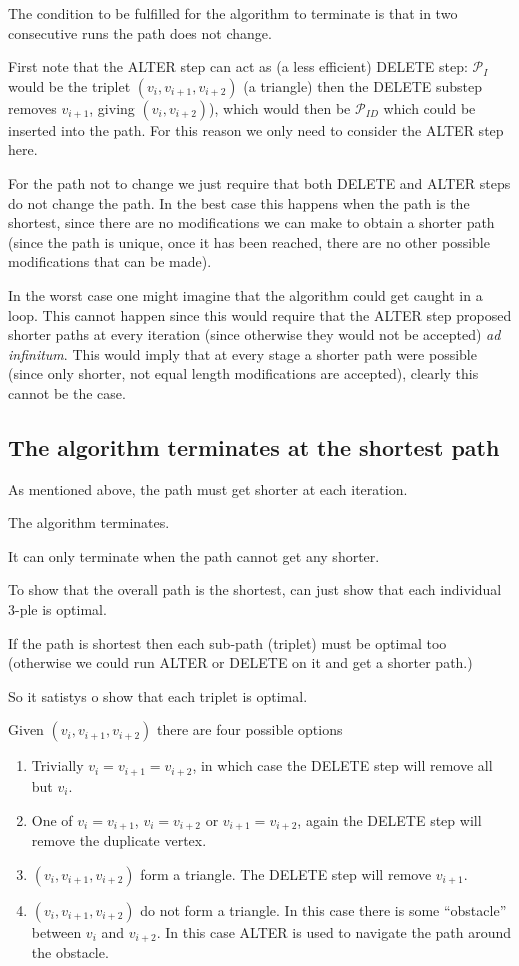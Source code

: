 The condition to be fulfilled for the algorithm to terminate is that in two consecutive runs the path does not change.

First note that the ALTER step can act as (a less efficient) DELETE step: $\mathcal{P}_{I}$ would be the triplet $(v_i,v_{i+1},v_{i+2})$ (a triangle) then the DELETE substep removes $v_{i+1}$, giving $(v_i,v_{i+2})$), which would then be $\mathcal{P}_{ID}$ which could be inserted into the path. For this reason we only need to consider the ALTER step here.

For the path not to change we just require that both DELETE and ALTER steps do not change the path. In the best case this happens when the path is the shortest, since there are no modifications we can make to obtain a shorter path (since the path is unique, once it has been reached, there are no other possible modifications that can be made).

In the worst case one might imagine that the algorithm could get caught in a loop. This cannot happen since this would require that the ALTER step proposed shorter paths at every iteration (since otherwise they would not be accepted) \textit{ad infinitum}. This would imply that at every stage a shorter path were possible (since only shorter, not equal length modifications are accepted), clearly this cannot be the case.

\subsection{The algorithm terminates at the shortest path}


As mentioned above, the path must get shorter at each iteration. 

The algorithm terminates.

It can only terminate when the path cannot get any shorter.

To show that the overall path is the shortest, can just show that each individual 3-ple is optimal.


If the path is shortest then each sub-path (triplet) must be optimal too (otherwise we could run ALTER or DELETE on it and get a shorter path.)

So it satistys o show that each triplet is optimal.


Given $(v_{i}, v_{i+1}, v_{i+2})$ there are four possible options
\begin{enumerate}
   \item Trivially $v_{i}=v_{i+1}=v_{i+2}$, in which case the DELETE step will remove all but $v_{i}$.
   \item One of $v_{i}=v_{i+1}$, $v_{i}=v_{i+2}$ or $v_{i+1}=v_{i+2}$, again the DELETE step will remove the duplicate vertex.
   \item $(v_{i}, v_{i+1}, v_{i+2})$ form a triangle. The DELETE step will remove $v_{i+1}$.
   \item $(v_{i}, v_{i+1}, v_{i+2})$ do not form a triangle. In this case there is some ``obstacle'' between $v_{i}$ and $v_{i+2}$. In this case ALTER is used to navigate the path around the obstacle.
\end{enumerate}

